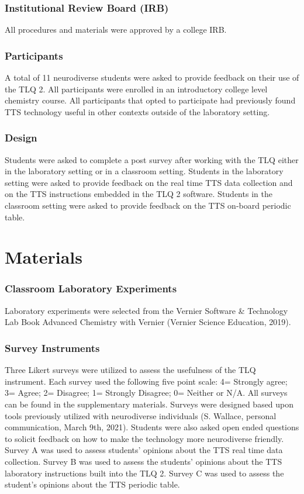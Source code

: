 \documentclass[11.5pt]{sig-alternate}
\begin{document}
\begin{large}
\subsubsection*{Institutional Review Board (IRB)}
All procedures and materials were approved by a college IRB.

\subsubsection*{Participants}
A total of 11 neurodiverse students were asked to provide feedback on their use of the TLQ 2.  All participants were enrolled in an introductory college level chemistry course.  All participants that opted to participate had previously found TTS technology useful in other contexts outside of the laboratory setting.

\subsubsection*{Design}
Students were asked to complete a post survey after working with the TLQ either in the laboratory setting or in a classroom setting.  Students in the laboratory setting were asked to provide feedback on the real time TTS data collection and on the TTS instructions embedded in the TLQ 2 software.  Students in the classroom setting were asked to provide feedback on the TTS on-board periodic table.  

\section*{Materials}
\subsubsection*{Classroom Laboratory Experiments}
Laboratory experiments were selected from the Vernier Software \& Technology Lab Book Advanced Chemistry with Vernier (Vernier Science Education, 2019).

\subsubsection*{Survey Instruments}
Three Likert surveys were utilized to assess the usefulness of the TLQ instrument.  Each survey used the following five point scale: 4= Strongly agree; 3= Agree; 2= Disagree; 1= Strongly Disagree; 0= Neither or N/A.  All surveys can be found in the supplementary materials.  Surveys were designed based upon tools previously utilized with neurodiverse individuals (S. Wallace, personal communication, March 9th, 2021).  Students were also asked open ended questions to solicit feedback on how to make the technology more neurodiverse friendly.  Survey A was used to assess students’ opinions about the TTS real time data collection.  Survey B was used to assess the students’ opinions about the TTS laboratory instructions built into the TLQ 2.  Survey C was used to assess the student’s opinions about the TTS periodic table.


\end{large}
\end{document}
